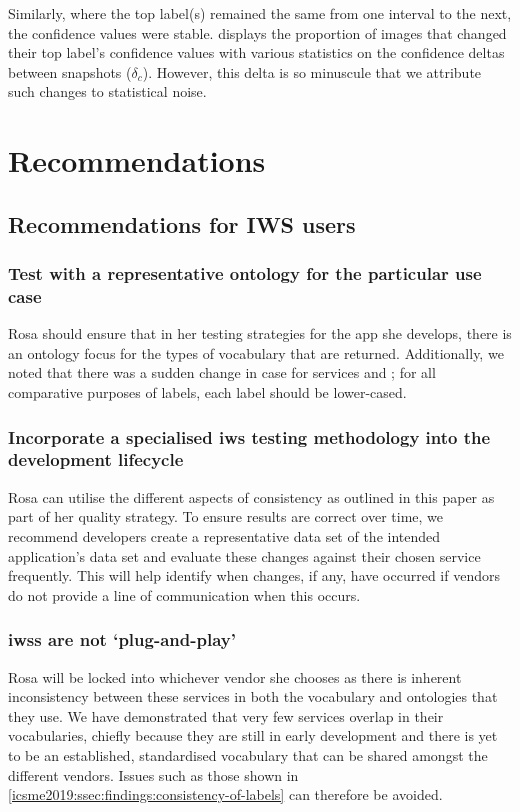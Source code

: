 Similarly, where the top label(s) remained the same from one interval to the next, the confidence values were stable.  displays the proportion of images that changed their top label's confidence values with various statistics on the confidence deltas between snapshots ($\delta_{c}$). However, this delta is so minuscule that we attribute such changes to statistical noise.

\section{Recommendations}
\label{icsme2019:sec:recommendations}

\subsection{Recommendations for IWS users}

\subsubsection{Test with a representative ontology for the particular use case}
Rosa should ensure that in her testing strategies for the app she develops, there is an ontology focus for the types of vocabulary that are returned. Additionally, we noted that there was a sudden change in case for services \googleapi{} and \awsapi{}; for all comparative purposes of labels, each label should be lower-cased. 

\subsubsection[Incorporate a specialised IWS testing methodology into the development lifecycle]{Incorporate a specialised \gls{iws} testing methodology into the development lifecycle}
Rosa can utilise the different aspects of consistency as outlined in this paper as part of her quality strategy. To ensure results are correct over time, we recommend developers create a representative data set of the intended application's data set and evaluate these changes against their chosen service frequently. This will help identify when changes, if any, have occurred if vendors do not provide a line of communication when this occurs.

\subsubsection[IWSs are not `plug-and-play']{\glspl{iws} are not `plug-and-play'}
Rosa will be locked into whichever vendor she chooses as there is inherent inconsistency between these services in both the vocabulary and ontologies that they use. We have demonstrated that very few services overlap in their vocabularies, chiefly because they are still in early development and there is yet to be an established, standardised vocabulary that can be shared amongst the different vendors.
 Issues such as those shown in \cref{icsme2019:ssec:findings:consistency-of-labels} can therefore be avoided.
 
